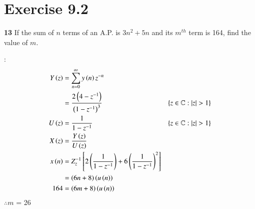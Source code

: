 \documentclass[journal,12pt,twocolumn]{IEEEtran}
\begin{document}


\vspace{3cm}

\title{}
\author{EE23BTECH11054 -  Sai Krishna Shanigarapu$^{*}$
}
\maketitle
\newpage
\bigskip


\section*{Exercise 9.2}

\noindent \textbf{13} \hspace{2pt}If the sum of $n$ terms of an A.P. is $3n^2+5n$ and its $m^{th}$ term is 164, find the value of $m$.
\bigskip

\solution:
\noindent
\begin{align}
Y\left(z\right) &=  \sum_{n=0}^{\infty} y\left(n\right)z^{-n} \\
&= \frac{2\left(4-z^{-1}\right)}{\left(1-z^{-1}\right)^3} & \left\{z\in\mathbb{C} : |z| > 1\right\}\\
U\left(z\right) &= \frac{1}{1-z^{-1}} & \left\{z\in\mathbb{C} : |z| > 1\right\}\\
X\left(z\right) &=  \frac{Y\left(z\right)}{U\left(z\right)}\\
x\left(n\right) &= Z_{z}^{-1}\left[2\left(\frac{1}{1-z^{-1}}\right) + 6\left(\frac{1}{1-z^{-1}}\right) ^2\right]\\
&= \left(6n+8\right)\left(u\left(n\right)\right)\\
164 &= \left(6m+8\right)\left(u\left(n\right)\right)
\end{align}
$\therefore m$ = 26
\end{document}
